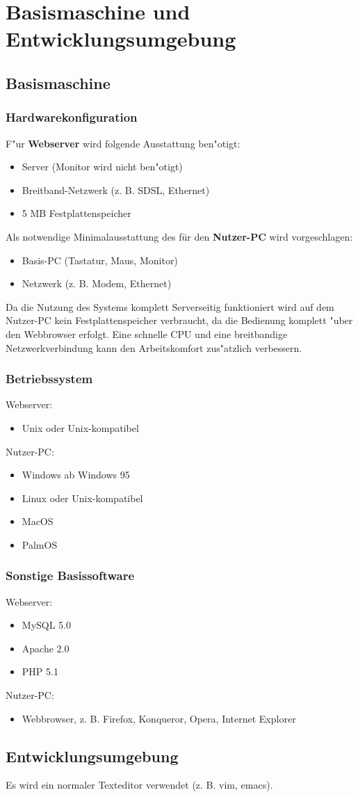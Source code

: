 \chapter{Basismaschine und Entwicklungsumgebung}
\section{Basismaschine}
\subsection{Hardwarekonfiguration}
F"ur {\bf Webserver} wird folgende Ausstattung ben"otigt:
\begin{itemize}
 \item Server (Monitor wird nicht ben"otigt)
 \item Breitband-Netzwerk (z. B. SDSL, Ethernet)
 \item 5 MB Festplattenspeicher
\end{itemize}
Als notwendige Minimalausstattung des für den {\bf Nutzer-PC} wird vorgeschlagen:
\begin{itemize}
 \item Basis-PC (Tastatur, Maus, Monitor)
 \item Netzwerk (z. B. Modem, Ethernet)
\end{itemize}
Da die Nutzung des Systems komplett Serverseitig funktioniert wird auf dem Nutzer-PC kein Festplattenspeicher verbraucht, da die
Bedienung komplett "uber den Webbrowser erfolgt. Eine schnelle CPU und eine breitbandige Netzwerkverbindung
kann den Arbeitskomfort zus"atzlich verbessern.


\subsection{Betriebssystem}
Webserver:
\begin{itemize}
\item Unix oder Unix-kompatibel
\end{itemize}
Nutzer-PC:
\begin{itemize}
\item Windows ab Windows 95
\item Linux oder Unix-kompatibel
\item MacOS
\item PalmOS
\end{itemize}

\subsection{Sonstige Basissoftware}
Webserver:
\begin{itemize}
\item MySQL 5.0
\item Apache 2.0
\item PHP 5.1
\end{itemize}
Nutzer-PC:
\begin{itemize}
\item Webbrowser, z. B. Firefox, Konqueror, Opera, Internet Explorer
\end{itemize}


\section{Entwicklungsumgebung}
Es wird ein normaler Texteditor verwendet (z. B. vim, emacs).
